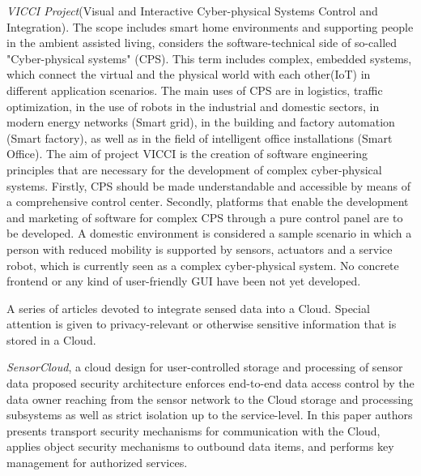     \emph{VICCI Project}(Visual and Interactive Cyber-physical Systems Control and Integration)\cite{vicci,6548811}. The scope includes smart home environments and supporting people in the ambient assisted living, considers the software-technical side of so-called "Cyber-physical systems" (CPS). This term includes complex, embedded systems, which connect the virtual and the physical world with each other(IoT) in different application scenarios. The main uses of CPS are in logistics, traffic optimization, in the use of robots in the industrial and domestic sectors, in modern energy networks (Smart grid), in the building and factory automation (Smart factory), as well as in the field of intelligent office installations (Smart Office). The aim of project VICCI is the creation of software engineering principles that are necessary for the development of complex cyber-physical systems. Firstly, CPS should be made understandable and accessible by means of a comprehensive control center. Secondly, platforms that enable the development and marketing of software for complex CPS through a pure control panel are to be developed. A domestic environment is considered a sample scenario in which a person with reduced mobility is supported by sensors, actuators and a service robot, which is currently seen as a complex cyber-physical system. No concrete frontend or any kind of user-friendly GUI have been not yet developed. 

	A series of articles devoted to integrate sensed data into a Cloud. Special attention is given to privacy-relevant or otherwise sensitive information that is stored in a Cloud. 

	\emph{SensorCloud}\cite{hummen2012cloud}, a cloud design for user-controlled storage and processing of sensor data proposed security architecture enforces end-to-end data access control by the data owner reaching from the sensor network to the Cloud storage and processing subsystems as well as strict isolation up to the service-level. In this paper authors presents transport security mechanisms for communication with the Cloud, applies object security mechanisms to outbound data items, and performs key management for authorized services. 

